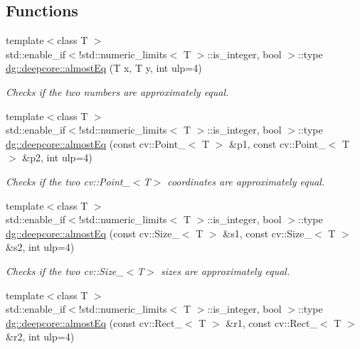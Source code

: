 \subsection*{Functions}
\begin{DoxyCompactItemize}
\item 
{\footnotesize template$<$class T $>$ }\\std\+::enable\+\_\+if$<$!std\+::numeric\+\_\+limits$<$ T $>$\+::is\+\_\+integer, bool $>$\+::type \hyperlink{group___utility_module_gaab89548f655eaadb805d9099ea0ec616}{dg\+::deepcore\+::almost\+Eq} (T x, T y, int ulp=4)
\begin{DoxyCompactList}\small\item\em Checks if the two numbers are approximately equal. \end{DoxyCompactList}\item 
{\footnotesize template$<$class T $>$ }\\std\+::enable\+\_\+if$<$!std\+::numeric\+\_\+limits$<$ T $>$\+::is\+\_\+integer, bool $>$\+::type \hyperlink{group___utility_module_ga2096c3bec84b70855daa9399ec178fe2}{dg\+::deepcore\+::almost\+Eq} (const cv\+::\+Point\+\_\+$<$ T $>$ \&p1, const cv\+::\+Point\+\_\+$<$ T $>$ \&p2, int ulp=4)
\begin{DoxyCompactList}\small\item\em Checks if the two cv\+::\+Point\+\_\+$<$\+T$>$ coordinates are approximately equal. \end{DoxyCompactList}\item 
{\footnotesize template$<$class T $>$ }\\std\+::enable\+\_\+if$<$!std\+::numeric\+\_\+limits$<$ T $>$\+::is\+\_\+integer, bool $>$\+::type \hyperlink{group___utility_module_ga71b9189756badfb3f5466bf9f0549203}{dg\+::deepcore\+::almost\+Eq} (const cv\+::\+Size\+\_\+$<$ T $>$ \&s1, const cv\+::\+Size\+\_\+$<$ T $>$ \&s2, int ulp=4)
\begin{DoxyCompactList}\small\item\em Checks if the two cv\+::\+Size\+\_\+$<$\+T$>$ sizes are approximately equal. \end{DoxyCompactList}\item 
{\footnotesize template$<$class T $>$ }\\std\+::enable\+\_\+if$<$!std\+::numeric\+\_\+limits$<$ T $>$\+::is\+\_\+integer, bool $>$\+::type \hyperlink{group___utility_module_ga115e2428efbb3b6d3105d8f2fab75e51}{dg\+::deepcore\+::almost\+Eq} (const cv\+::\+Rect\+\_\+$<$ T $>$ \&r1, const cv\+::\+Rect\+\_\+$<$ T $>$ \&r2, int ulp=4)

\end{DoxyCompactItemize}
